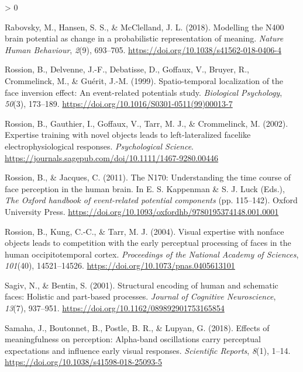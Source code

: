\documentclass[
  english,
  doc,12pt,twoside,floatsintext]{apa7}
\newlength{\cslhangindent}
\newenvironment{CSLReferences}[2] %
 {%
  \setlength{\parindent}{0pt}
  \ifodd #1 \everypar{\setlength{\hangindent}{\cslhangindent}}\ignorespaces\fi
  \ifnum #2 > 0
  \setlength{\parskip}{#2\baselineskip}
  \fi
 }%
 {}
\begin{document}
\begin{CSLReferences}{1}{0}
\leavevmode\hypertarget{ref-rabovsky2018}{}%
Rabovsky, M., Hansen, S. S., \& McClelland, J. L. (2018). Modelling the {N400} brain potential as change in a probabilistic representation of meaning. \emph{Nature Human Behaviour}, \emph{2}(9), 693--705. \url{https://doi.org/10.1038/s41562-018-0406-4}

\leavevmode\hypertarget{ref-rossion1999}{}%
Rossion, B., Delvenne, J.-F., Debatisse, D., Goffaux, V., Bruyer, R., Crommelinck, M., \& Guérit, J.-M. (1999). Spatio-temporal localization of the face inversion effect: An event-related potentials study. \emph{Biological Psychology}, \emph{50}(3), 173--189. \url{https://doi.org/10.1016/S0301-0511(99)00013-7}

\leavevmode\hypertarget{ref-rossion2002}{}%
Rossion, B., Gauthier, I., Goffaux, V., Tarr, M. J., \& Crommelinck, M. (2002). Expertise training with novel objects leads to left-lateralized facelike electrophysiological responses. \emph{Psychological Science}. \url{https://journals.sagepub.com/doi/10.1111/1467-9280.00446}

\leavevmode\hypertarget{ref-rossion2011}{}%
Rossion, B., \& Jacques, C. (2011). The {N170}: Understanding the time course of face perception in the human brain. In E. S. Kappenman \& S. J. Luck (Eds.), \emph{The {Oxford} handbook of event-related potential components} (pp. 115--142). Oxford University Press. \url{https://doi.org/10.1093/oxfordhb/9780195374148.001.0001}

\leavevmode\hypertarget{ref-rossion2004}{}%
Rossion, B., Kung, C.-C., \& Tarr, M. J. (2004). Visual expertise with nonface objects leads to competition with the early perceptual processing of faces in the human occipitotemporal cortex. \emph{Proceedings of the National Academy of Sciences}, \emph{101}(40), 14521--14526. \url{https://doi.org/10.1073/pnas.0405613101}

\leavevmode\hypertarget{ref-sagiv2001}{}%
Sagiv, N., \& Bentin, S. (2001). Structural encoding of human and schematic faces: Holistic and part-based processes. \emph{Journal of Cognitive Neuroscience}, \emph{13}(7), 937--951. \url{https://doi.org/10.1162/089892901753165854}

\leavevmode\hypertarget{ref-samaha2018}{}%
Samaha, J., Boutonnet, B., Postle, B. R., \& Lupyan, G. (2018). Effects of meaningfulness on perception: Alpha-band oscillations carry perceptual expectations and influence early visual responses. \emph{Scientific Reports}, \emph{8}(1), 1--14. \url{https://doi.org/10.1038/s41598-018-25093-5}


\end{CSLReferences}
\end{document}
